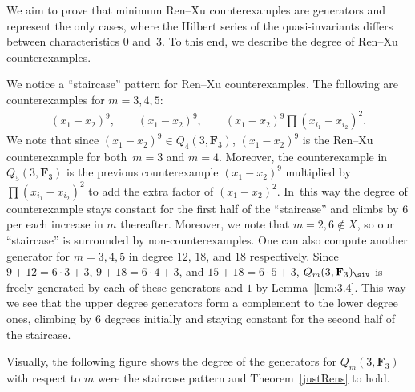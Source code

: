 We aim to prove that minimum Ren--Xu counterexamples are generators and represent the only cases, where the Hilbert series of the quasi-invariants differs between characteristics $0$ and~$3$. To this end, we describe the degree of Ren--Xu counterexamples.

\begin{Example}
 We notice a ``staircase'' pattern for Ren--Xu counterexamples. The following are counterexamples for $m=3,4,5$:
 \begin{gather*}
 (x_1-x_2)^9, \qquad (x_1-x_2)^9,\qquad
 (x_1-x_2)^9\prod (x_{i_1}-x_{i_2})^2.
 \end{gather*}
 We note that since $(x_1-x_2)^9\in Q_4(3,\mathbf{F}_3)$, $(x_1-x_2)^9$ is the Ren--Xu counterexample for both~${m=3}$ and $m=4$. Moreover, the counterexample in $Q_5(3,\mathbf{F}_3)$ is the previous counterexample $(x_1-x_2)^9$ multiplied by $\prod (x_{i_1}-x_{i_2})^2$ to add the extra factor of $(x_1-x_2)^2$. In~this way the degree of counterexample stays constant for the first half of the ``staircase'' and climbs by $6$ per each increase in $m$ thereafter. Moreover, we note that $m=2,6\not\in X$, so our ``staircase'' is surrounded by non-counterexamples. One can also compute another generator for $m=3, 4, 5$ in degree $12$, $18$, and $18$ respectively. Since $9+12=6\cdot 3+3$, $9+18=6\cdot 4+3$, and $15+18=6\cdot 5 +3$, $Q_m(3,\mathbf{F}_3)_{\siv}$ is freely generated by each of these generators and $1$ by Lemma~\ref{lem:3.4}. This way we see that the upper degree generators form a complement to the lower degree ones, climbing by $6$ degrees initially and staying constant for the second half of the staircase.

 Visually, the following figure shows the degree of the generators for $Q_m(3,\mathbf{F}_3)$ with respect to $m$ were the staircase pattern and Theorem~\ref{justRens} to hold.
 \begin{figure}[ht]%
 \centering
\end{figure}
\end{Example}
